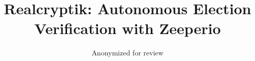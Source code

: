 \documentclass[runningheads]{llncs}
\begin{document}
\title{Realcryptik: Autonomous Election Verification with Zeeperio}

\author{Anonymized for review}
\institute{}





\maketitle














\clearpage
\appendix
% 
\end{document}
